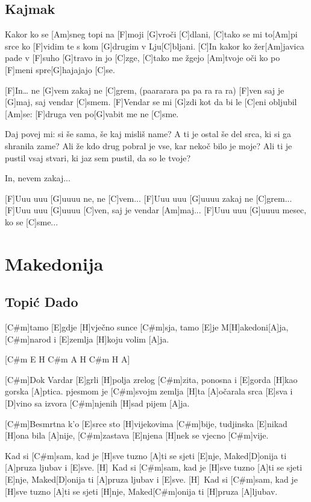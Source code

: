 \documentclass[a4paper,12pt]{article}
\begin{document}
\begin{multicols}{2}
\subsection*{Kajmak}
\begin{guitar}
[C]Kakor ko se [Am]sneg topi na [F]moji [G]vroči [C]dlani, 
[C]tako se mi to[Am]pi srce ko 
[F]vidim te s kom [G]drugim v Lju[C]bljani. 
[C]In kakor ko žer[Am]javica pade v 
[F]suho [G]travo in jo [C]zge, 
[C]tako me žgejo [Am]tvoje oči ko po 
[F]meni spre[G]hajajajo [C]se.


[F]In…	ne [G]vem zakaj ne [C]grem, 
(paararara pa pa ra ra ra) 
[F]ven saj je [G]maj, saj vendar [C]smem. 
[F]Vendar se mi [G]zdi kot da bi le [C]eni obljubil [Am]se: 
[F]druga ven po[G]vabit me ne [C]sme. 


Daj povej mi: si še sama, 
še kaj misliš name? 
A ti je ostal še del srca, 
ki si ga shranila zame? 
Ali že kdo drug pobral je vse, 
kar nekoč bilo je moje?
Ali ti je pustil vsaj stvari, 
ki jaz sem pustil, da so le tvoje? 


In, nevem zakaj... 


[F]Uuu uuu [G]uuuu ne, ne [C]vem... 
[F]Uuu uuu [G]uuuu zakaj ne [C]grem... 
[F]Uuu uuu [G]uuuu [C]ven, saj je vendar [Am]maj... 
[F]Uuu uuu [G]uuuu mesec, ko se [C]sme... 

\end{guitar}
\section{Makedonija}
\subsection*{Topić Dado}
\begin{guitar}
[C#m H A 2x]


[C#m]tamo [E]gdje [H]vječno sunce [C#m]sja,
tamo [E]je M[H]akedoni[A]ja,
[C#m]narod i [E]zemlja [H]koju volim [A]ja.


[C#m E H C#m A H C#m H A]


[C#m]Dok Vardar [E]grli [H]polja zrelog [C#m]zita,
ponosna i [E]gorda [H]kao gorska [A]ptica.
pjesmom je [C#m]svojm zemlja [H]ta [A]očarala srca [E]sva
i [D]vino sa izvora [C#m]njenih [H]sad pijem [A]ja.



[C#m]Besmrtna k'o [E]srce sto [H]vijekovima [C#m]bije,
tudjinska [E]nikad [H]ona bila [A]nije,
[C#m]zastava [E]njena [H]nek se vjecno [C#m]vije.


Kad si [C#m]sam, kad je [H]sve tuzno [A]ti se sjeti [E]nje,
Maked[D]onija ti [A]pruza ljubav i [E]sve. [H]\
Kad si [C#m]sam, kad je [H]sve tuzno [A]ti se sjeti [E]nje,
Maked[D]onija ti [A]pruza ljubav i [E]sve. [H]\
Kad si [C#m]sam, kad je [H]sve tuzno [A]ti se sjeti [H]nje,
Maked[C#m]onija ti [H]pruza [A]ljubav.



\end{guitar}
\end{multicols}
\end{document}

